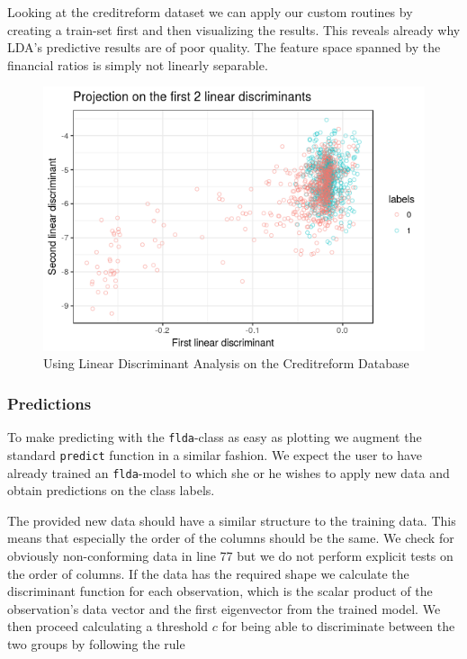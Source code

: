 \documentclass{article}
\begin{document}
Looking at the creditreform dataset we can apply our custom routines by creating a train-set first and then visualizing the results. This reveals already why LDA's predictive results are of poor quality. The feature space spanned by the financial ratios is simply not linearly separable.




\begin{figure}
\caption{Using Linear Discriminant Analysis on the Creditreform Database}
\centering
\includegraphics{../LDA/creditLDA.png}
\end{figure}

\subsubsection{Predictions}

To make predicting with the \texttt{flda}-class as easy as plotting we augment the standard \texttt{predict} function in a similar fashion. We expect the user to have already trained an \texttt{flda}-model to which she or he wishes to apply new data and obtain predictions on the class labels. 



The provided new data should have a similar structure to the training data. This means that especially the order of the columns should be the same. We check for obviously non-conforming data in line 77 but we do not perform explicit tests on the order of columns. If the data has the required shape we calculate the discriminant function for each observation, which is the scalar product of the observation's data vector and the first eigenvector from the trained model. We then proceed calculating a threshold $c$ for being able to discriminate between the two groups by following the rule
\end{document}
